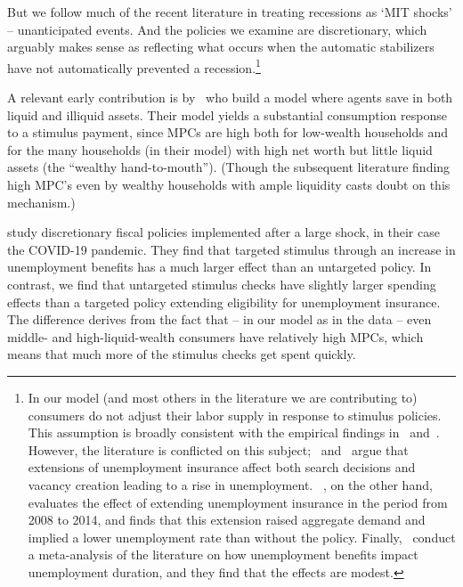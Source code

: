 \documentclass[\latexroot/\projectname]{subfiles}
\begin{document}
But we follow much of the recent literature in treating recessions as `MIT shocks' -- unanticipated events. And the policies we examine are discretionary, which arguably makes sense as reflecting what occurs when the automatic stabilizers have not automatically prevented a recession.\footnote{
  In our model (and most others in the literature we are contributing to) consumers do not adjust their labor supply in response to stimulus policies. 
  This assumption is broadly consistent with the empirical findings in~\cite{ganong2022spending} and~\cite{chodorow2016limited}.
  However, the literature is conflicted on this subject;~\cite{hmmUnemployment} and~\cite{hagedorn2019unemployment} argue that extensions of unemployment insurance affect both search decisions and vacancy creation leading to a rise in unemployment.
  ~\cite{kekre2022unemp}, on the other hand, evaluates the effect of extending unemployment insurance in the period from 2008 to 2014, and finds that this extension raised aggregate demand and implied a lower unemployment rate than without the policy.
  Finally,~\cite{cohenDisemployment} conduct a meta-analysis of the literature on how unemployment benefits impact unemployment duration, and they find that the effects are modest.}

A relevant early contribution is by~\cite{kaplan2014model} who build a model where agents save in both liquid and illiquid assets. %
Their model yields a substantial consumption response to a stimulus payment, since MPCs are high both for low-wealth households and for the many households (in their model) with high net worth but little liquid assets (the ``wealthy hand-to-mouth'').  (Though the subsequent literature finding high MPC's even by wealthy households with ample liquidity casts doubt on this mechanism.)

\cite{bayercoronavirus} study discretionary fiscal policies implemented after a large shock, in their case the COVID-19 pandemic. %
They find that targeted stimulus through an increase in unemployment benefits has a much larger effect than an untargeted policy.
In contrast, we find that untargeted stimulus checks have slightly larger spending effects than a targeted policy extending eligibility for unemployment insurance. %
The difference derives from the fact that -- in our model as in the data -- even middle- and high-liquid-wealth consumers have relatively high MPCs, which means that much more of the stimulus checks get spent quickly.
\end{document}
